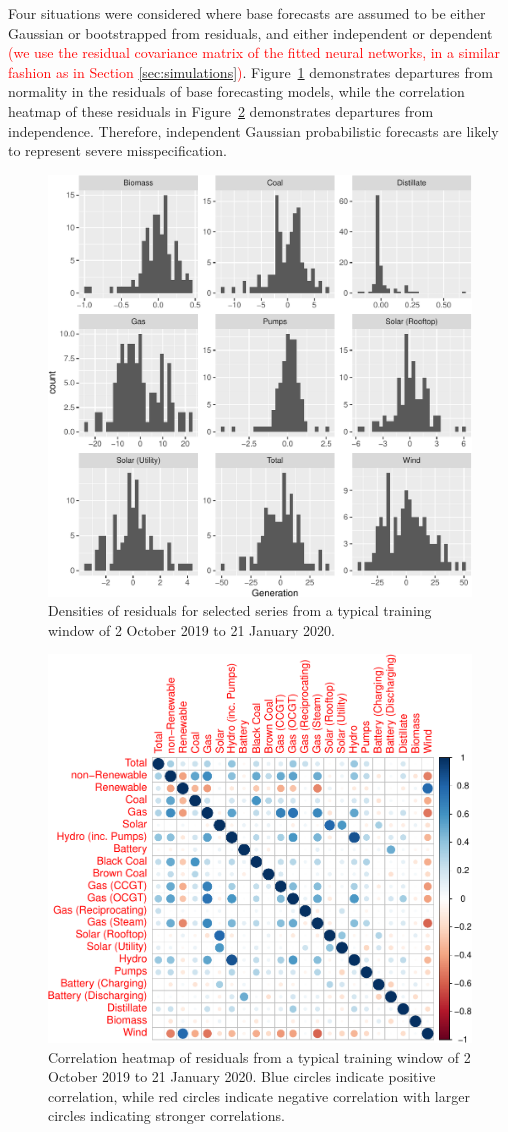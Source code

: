 \documentclass[a4paper,12pt]{article}
\theoremstyle{definition}
\begin{document}
Four situations were considered where base forecasts are assumed to be either Gaussian or bootstrapped from residuals, and either independent or dependent \textcolor{red}{(we use the residual covariance matrix of the fitted neural networks, in a similar fashion as in Section \ref{sec:simulations})}. Figure~\ref{fig:emp_hist} demonstrates departures from normality in the residuals of base forecasting models, while the correlation heatmap of these residuals in Figure~\ref{fig:emp_corr} demonstrates departures from independence. Therefore, independent Gaussian probabilistic forecasts are likely to represent severe misspecification.

\begin{figure}[!htb]
	\centering
	\includegraphics[width=.7\textwidth]{densities.pdf}
	\caption{Densities of residuals for selected series from a typical training window of 2 October 2019 to 21 January 2020.}
	\label{fig:emp_hist}
\end{figure}

\begin{figure}[!htb]
	\centering
	\includegraphics[width=.55\textwidth]{corr.pdf}
	\caption{Correlation heatmap of residuals from a typical training window of 2 October 2019 to 21 January 2020. Blue circles indicate positive correlation, while red circles indicate negative correlation with larger circles indicating stronger correlations.}
	\label{fig:emp_corr}
\end{figure}
\end{document}
